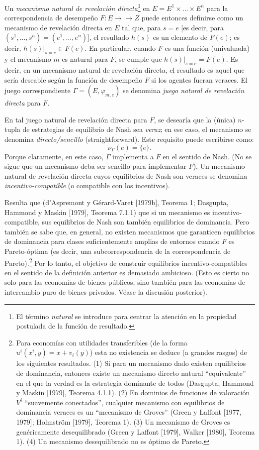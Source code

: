\documentclass[12pt, letterpaper]{article}
\begin{document}
Un \textit{mecanismo natural de revelación directa}\footnote{El término \textit{natural} se introduce para centrar la atención en la propiedad postulada de la función de resultado.} en $E = E^1 \times \dots \times E^n$ para la correspondencia de desempeño $F \colon E \to\to Z$ puede entonces definirse como un mecanismo de revelación directa en $E$ tal que, para $s = e$ [es decir, para $(s^1, \dots, s^n) = (e^1, \dots, e^n)$], el resultado $h(s)$ es un elemento de $F(e)$; es decir, $h(s)|_{s=e} \in F(e)$. En particular, cuando $F$ es una función (univaluada) y el mecanismo $m$ es natural para $F$, se cumple que $h(s)|_{s=e} = F(e)$. Es decir, en un mecanismo natural de revelación directa, el resultado es aquel que sería deseable según la función de desempeño $F$ si los agentes fueran veraces. El juego correspondiente $\Gamma = (E, \varphi_{m,e})$ se denomina \textit{juego natural de revelación directa} para $F$.

En tal juego natural de revelación directa para $F$, se desearía que la (única) $n$-tupla de estrategias de equilibrio de Nash sea \textit{veraz}; en ese caso, el mecanismo se denomina \textit{directo/sencillo} (straightforward). Este requisito puede escribirse como:
\[
\nu_\Gamma(e) = \{e\}.
\]
Porque claramente, en este caso, $\Gamma$ implementa a $F$ en el sentido de Nash. (No se sigue que un mecanismo deba ser sencillo para implementar $F$). Un mecanismo natural de revelación directa cuyos equilibrios de Nash son veraces se denomina \textit{incentivo-compatible} (o compatible con los incentivos).

Resulta que (d'Aspremont y Gérard-Varet [1979b], Teorema 1; Dasgupta, Hammond y Maskin [1979], Teorema 7.1.1) que si un mecanismo es incentivo-compatible, sus equilibrios de Nash son también equilibrios de dominancia. Pero también se sabe que, en general, no existen mecanismos que garanticen equilibrios de dominancia para clases suficientemente amplias de entornos cuando $F$ es Pareto-óptima (es decir, una subcorrespondencia de la correspondencia de Pareto).\footnote{Para economías con utilidades transferibles (de la forma $u^i(x^i, y) = x + v_i(y)$) esta no existencia se deduce (a grandes rasgos) de los siguientes resultados. (1) Si para un mecanismo dado existen equilibrios de dominancia, entonces existe un mecanismo directo natural ``equivalente'' en el que la verdad es la estrategia dominante de todos (Dasgupta, Hammond y Maskin [1979], Teorema 4.1.1). (2) En dominios de funciones de valoración $V^i$ ``suavemente conectados'', cualquier mecanismo con equilibrios de dominancia veraces es un ``mecanismo de Groves'' (Green y Laffont [1977, 1979]; Holmström [1979], Teorema 1). (3) Un mecanismo de Groves es genéricamente desequilibrado (Green y Laffont [1979], Walker [1980], Teorema 1). (4) Un mecanismo desequilibrado no es óptimo de Pareto.} Por lo tanto, el objetivo de construir equilibrios incentivo-compatibles en el sentido de la definición anterior es demasiado ambicioso. (Esto es cierto no solo para las economías de bienes públicos, sino también para las economías de intercambio puro de bienes privados. Véase la discusión posterior).
\end{document}
